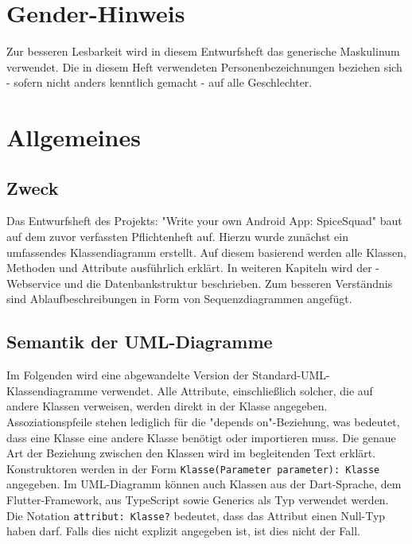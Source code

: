 \documentclass{entwurfsheft}
\begin{document}

\maketitle
\begin{sloppypar}
\tableofcontents
\newpage

\section*{Gender-Hinweis}
Zur besseren Lesbarkeit wird in diesem Entwurfsheft das generische Maskulinum verwendet.
Die in diesem Heft verwendeten Personenbezeichnungen beziehen sich - sofern nicht anders kenntlich gemacht - auf alle Geschlechter.
\newpage

\section{Allgemeines}
\subsection{Zweck}
Das Entwurfsheft des Projekts: "Write your own Android App: SpiceSquad" baut auf dem zuvor verfassten Pflichtenheft auf.
Hierzu wurde zunächst ein umfassendes Klassendiagramm erstellt. Auf diesem basierend werden alle Klassen, Methoden und Attribute ausführlich erklärt.
In weiteren Kapiteln wird der -Webservice und die Datenbankstruktur beschrieben. Zum besseren Verständnis sind Ablaufbeschreibungen in Form von Sequenzdiagrammen angefügt.

\subsection{Semantik der UML-Diagramme}
Im Folgenden wird eine abgewandelte Version der Standard-UML-Klassendiagramme verwendet. Alle Attribute, einschließlich solcher, die auf andere Klassen verweisen, werden direkt in der Klasse angegeben. Assoziationspfeile stehen lediglich für die "depends on"-Beziehung, was bedeutet, dass eine Klasse eine andere Klasse benötigt oder importieren muss. Die genaue Art der Beziehung zwischen den Klassen wird im begleitenden Text erklärt. Konstruktoren werden in der Form \texttt{Klasse(Parameter parameter): Klasse} angegeben. Im UML-Diagramm können auch Klassen aus der Dart-Sprache, dem Flutter-Framework, aus TypeScript sowie Generics als Typ verwendet werden. Die Notation \texttt{attribut: Klasse?} bedeutet, dass das Attribut einen Null-Typ haben darf. Falls dies nicht explizit angegeben ist, ist dies nicht der Fall.


\end{sloppypar}
\end{document}
